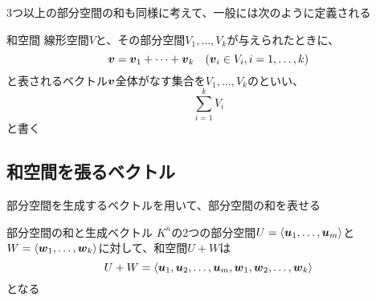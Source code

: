 \documentclass[../../../topic_linear-algebra]{subfiles}
\begin{document}
\br

3つ以上の部分空間の和も同様に考えて、一般には次のように定義される

\begin{definition}{和空間}
  線形空間$V$と、その部分空間$V_1,\ldots,V_k$が与えられたときに、
  \begin{equation*}
    \vb*{v} = \vb*{v}_1 + \cdots + \vb*{v}_k \quad (\vb*{v}_i \in V_i, i = 1, \ldots, k)
  \end{equation*}
  と表されるベクトル$\vb*{v}$全体がなす集合を$V_1,\ldots,V_k$のといい、
  \begin{equation*}
    \sum_{i=1}^k V_i
  \end{equation*}
  と書く
\end{definition}

\subsection{和空間を張るベクトル}

部分空間を生成するベクトルを用いて、部分空間の和を表せる

\begin{theorem}{部分空間の和と生成ベクトル}\label{thm:sum-of-subspaces-span}
  $K^n$の2つの部分空間$U = \langle \vb*{u}_1, \dots, \vb*{u}_m \rangle$と
  $W = \langle \vb*{w}_1, \dots, \vb*{w}_k \rangle$に対して、和空間$U + W$は
  \begin{equation*}
    U + W = \langle \vb*{u}_1, \vb*{u}_2, \dots, \vb*{u}_m, \vb*{w}_1, \vb*{w}_2, \dots, \vb*{w}_k \rangle
  \end{equation*}
  となる
\end{theorem}
\end{document}
